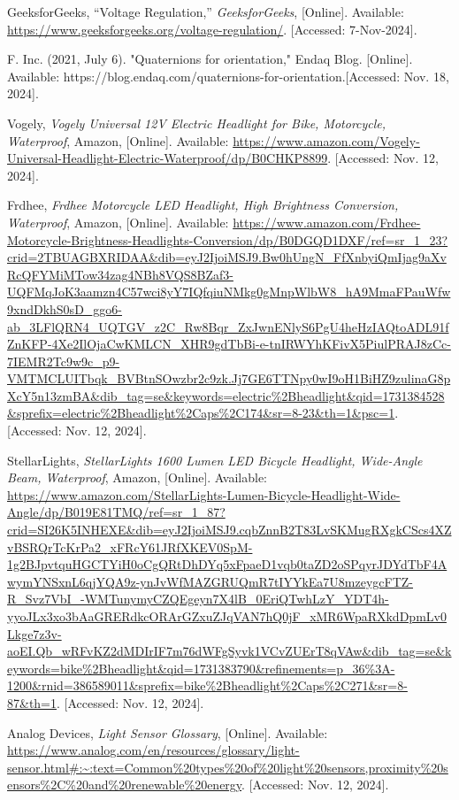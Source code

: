 \begin{thebibliography}{45}
	GeeksforGeeks, ``Voltage Regulation,'' \textit{GeeksforGeeks}, [Online]. Available: \url{https://www.geeksforgeeks.org/voltage-regulation/}. [Accessed: 7-Nov-2024].
	
	 F. Inc. (2021, July 6). "Quaternions for orientation," Endaq Blog. [Online]. Available: https://blog.endaq.com/quaternions-for-orientation.[Accessed: Nov. 18, 2024].

	Vogely, \textit{Vogely Universal 12V Electric Headlight for Bike, Motorcycle, Waterproof}, Amazon, [Online]. Available: \url{https://www.amazon.com/Vogely-Universal-Headlight-Electric-Waterproof/dp/B0CHKP8899}. [Accessed: Nov. 12, 2024].
	
	Frdhee, \textit{Frdhee Motorcycle LED Headlight, High Brightness Conversion, Waterproof}, Amazon, [Online]. Available: \url{https://www.amazon.com/Frdhee-Motorcycle-Brightness-Headlights-Conversion/dp/B0DGQD1DXF/ref=sr_1_23?crid=2TBUAGBXRIDAA&dib=eyJ2IjoiMSJ9.Bw0hUngN_FfXnbyiQmIjag9aXvRcQFYMiMTow34zag4NBh8VQS8BZaf3-UQFMqJoK3aamzn4C57wci8yY7IQfqiuNMkg0gMnpWlbW8_hA9MmaFPauWfw9xndDkhS0sD_ggo6-ab_3LFlQRN4_UQTGV_z2C_Rw8Bqr_ZxJwnENlyS6PgU4heHzIAQtoADL91fZnKFP-4Xe2IlOjaCwKMLCN_XHR9gdTbBi-e-tnIRWYhKFivX5PiulPRAJ8zCc-7IEMR2Tc9w9c_p9-VMTMCLUITbqk_BVBtnSOwzbr2c9zk.Jj7GE6TTNpy0wI9oH1BiHZ9zulinaG8pXcY5n13zmBA&dib_tag=se&keywords=electric%2Bheadlight&qid=1731384528&sprefix=electric%2Bheadlight%2Caps%2C174&sr=8-23&th=1&psc=1}. [Accessed: Nov. 12, 2024].
	
	StellarLights, \textit{StellarLights 1600 Lumen LED Bicycle Headlight, Wide-Angle Beam, Waterproof}, Amazon, [Online]. Available: \url{https://www.amazon.com/StellarLights-Lumen-Bicycle-Headlight-Wide-Angle/dp/B019E81TMQ/ref=sr_1_87?crid=SI26K5INHEXE&dib=eyJ2IjoiMSJ9.cqbZnnB2T83LvSKMugRXgkCScs4XZvBSRQrTcKrPa2_xFRcY61JRfXKEV0SpM-1g2BJpvtquHGCTYiH0oCgQRtDhDYq5xFpaeD1vqb0taZD2oSPqyrJDYdTbF4AwymYNSxnL6qjYQA9z-ynJvWfMAZGRUQmR7tIYYkEa7U8mzeygcFTZ-R_Svz7VbI_-WMTunymyCZQEgeyn7X4lB_0EriQTwhLzY_YDT4h-yyoJLx3xo3bAaGRERdkcORArGZxuZJqVAN7hQ0jF_xMR6WpaRXkdDpmLv0Lkge7z3v-aoEI.Qb_wRFvKZ2dMDIrIF7m76dWFgSyvk1VCvZUErT8qVAw&dib_tag=se&keywords=bike%2Bheadlight&qid=1731383790&refinements=p_36%3A-1200&rnid=386589011&sprefix=bike%2Bheadlight%2Caps%2C271&sr=8-87&th=1}. [Accessed: Nov. 12, 2024].
	
	Analog Devices, \textit{Light Sensor Glossary}, [Online]. Available: \url{https://www.analog.com/en/resources/glossary/light-sensor.html#:~:text=Common%20types%20of%20light%20sensors,proximity%20sensors%2C%20and%20renewable%20energy}. [Accessed: Nov. 12, 2024].
	

\end{thebibliography}
